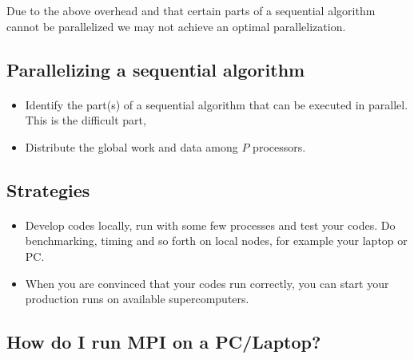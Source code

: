 \documentclass[%
oneside,                 %
final,                   %
10pt]{article}
\begin{document}
\noindent
Due to the above overhead and that certain parts of a sequential
algorithm cannot be parallelized we may not achieve an optimal parallelization.




\subsection{Parallelizing a sequential algorithm}

\paragraph{}

\begin{itemize}
\item Identify the part(s) of a sequential algorithm that can be  executed in parallel. This is the difficult part,

\item Distribute the global work and data among $P$ processors.
\end{itemize}

\noindent






\subsection{Strategies}

\paragraph{}
\begin{itemize}
\item Develop codes locally, run with some few processes and test your codes.  Do benchmarking, timing and so forth on local nodes, for example your laptop or PC. 

\item When you are convinced that your codes run correctly, you can start your production runs on available supercomputers.
\end{itemize}

\noindent



\subsection{How do I run MPI on a PC/Laptop?}
\end{document}
